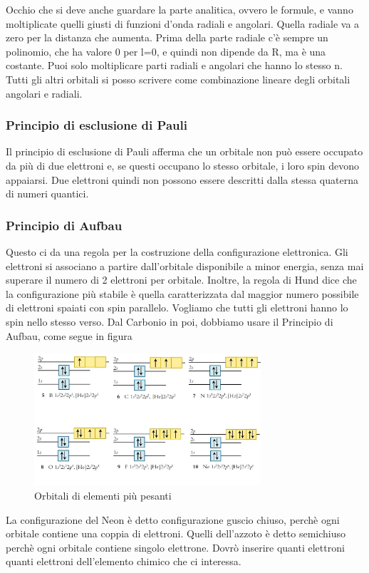 \documentclass[a4paper]{article}
\begin{document}
Occhio che si deve anche guardare la parte analitica, ovvero le formule, e vanno moltiplicate quelli giusti di funzioni d'onda radiali e angolari. Quella radiale va a zero per la distanza che aumenta. Prima della parte radiale c'è sempre un polinomio, che ha valore 0 per l=0, e quindi non dipende da R, ma è una costante. Puoi solo moltiplicare parti radiali e angolari che hanno lo stesso n. Tutti gli altri orbitali si posso scrivere come combinazione lineare degli orbitali angolari e radiali. 

\subsubsection{Principio di esclusione di Pauli}
Il principio di esclusione di Pauli afferma che un orbitale non può essere occupato da più di due elettroni e, se questi occupano lo stesso orbitale, i loro spin devono appaiarsi. Due elettroni quindi non possono essere descritti dalla stessa quaterna di numeri quantici. 

\subsubsection{Principio di Aufbau}
Questo ci da una regola per la costruzione della configurazione elettronica. Gli elettroni si associano a partire dall'orbitale disponibile a minor energia, senza mai superare il numero di 2 elettroni per orbitale. Inoltre, la regola di Hund dice che la configurazione più stabile è quella caratterizzata dal maggior numero possibile di elettroni spaiati con spin parallelo. Vogliamo che tutti gli elettroni hanno lo spin nello stesso verso. Dal Carbonio in poi, dobbiamo usare il Principio di Aufbau, come segue in figura
\begin{figure}[!ht]
    \centering
    \includegraphics[width=0.75\textwidth]{orbitali.png}
    \caption{Orbitali di elementi più pesanti}
\end{figure}
\FloatBarrier
La configurazione del Neon è detto configurazione guscio chiuso, perchè ogni orbitale contiene una coppia di elettroni. Quelli dell'azzoto è detto semichiuso perchè ogni orbitale contiene singolo elettrone. Dovrò inserire quanti elettroni quanti elettroni dell'elemento chimico che ci interessa.
\end{document}
